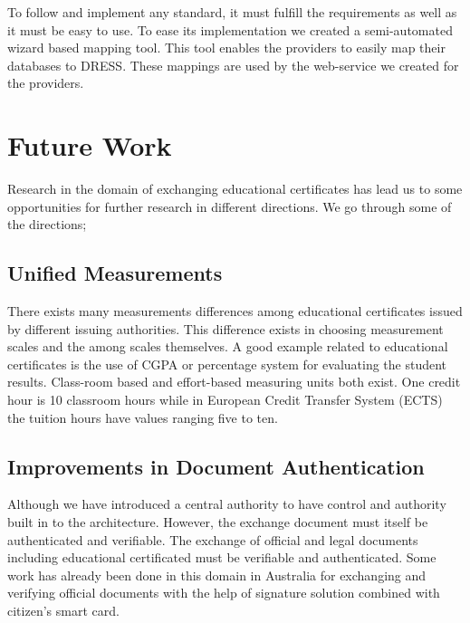 \documentclass[12pt,a4paper,oneside]{book}
\begin{document}
	To follow and implement any standard, it must fulfill the requirements as well as it must be easy to use. To ease its implementation we created a semi-automated wizard based mapping tool. This tool enables the providers to easily map their databases to DRESS. These mappings are used by the web-service we created for the providers.
	
	 
		
	
	\section{Future Work}\label{sec:future}
	Research in the domain of exchanging educational certificates has lead us to some opportunities for further research in different directions. We go through some of the directions; 
	
	\subsection{Unified Measurements} 
	There exists many measurements differences among educational certificates issued by different issuing authorities. This difference exists in choosing measurement scales and the among scales themselves. A good example related to educational certificates is the use of CGPA or percentage system for evaluating the student results. Class-room based and effort-based measuring units both exist. One credit hour is 10 classroom hours while in European Credit Transfer System (ECTS) the tuition hours have values ranging five  to ten. \cite{EHEA}
	
	\subsection{Improvements in Document Authentication} 
	Although we have introduced a central authority to have control and authority built in to the architecture. However, the exchange document must itself be authenticated and verifiable. The exchange of official and legal documents including educational certificated must be verifiable and authenticated. Some work has already been done in this domain in Australia for exchanging and verifying  official documents with the help of signature solution combined with citizen's smart card\cite{Authentic PDF}. \\
	
	
\end{document}
